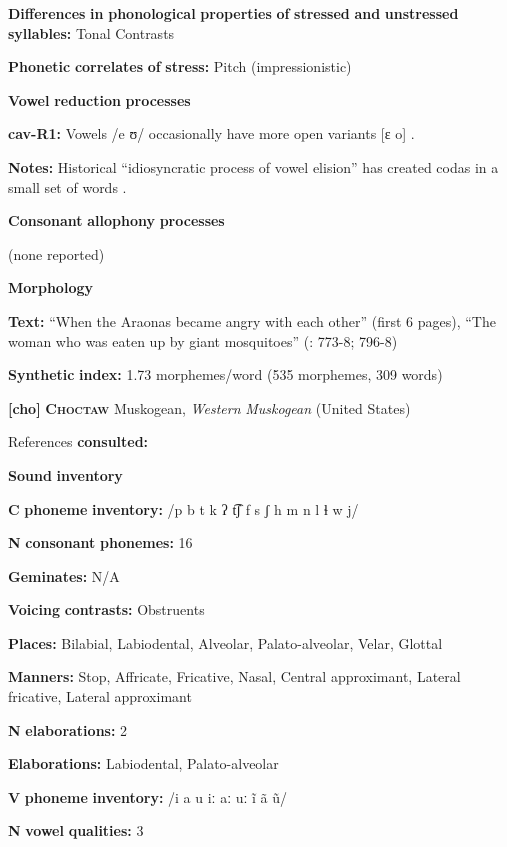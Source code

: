 \begin{styleBody}
\textbf{Differences} \textbf{in} \textbf{phonological} \textbf{properties} \textbf{of} \textbf{stressed} \textbf{and} \textbf{unstressed} \textbf{syllables:} Tonal Contrasts

\textbf{Phonetic} \textbf{correlates} \textbf{of} \textbf{stress:} Pitch (impressionistic)

\textbf{Vowel} \textbf{reduction} \textbf{processes}

\textbf{cav-R1:} Vowels /e ʊ/ occasionally have more open variants [ɛ o] \citep[29]{Guillaume2008}.

\textbf{Notes:} Historical “idiosyncratic process of vowel elision” has created codas in a small set of words \citep[29]{Guillaume2008}.

\textbf{Consonant} \textbf{allophony} \textbf{processes}

(none reported)

\textbf{Morphology}

\textbf{Text:} “When the Araonas became angry with each other” (first 6 pages), “The woman who was eaten up by giant mosquitoes” (\citealt{Guillaume2008}: 773-8; 796-8)

\textbf{Synthetic} \textbf{index:} 1.73 morphemes/word (535 morphemes, 309 words)

\textbf{[cho]}   \textbf{\textsc{Choctaw}}  Muskogean, \textit{Western} \textit{Muskogean} (United States)

References \textbf{consulted:} \citet{Broadwell2006}

\textbf{Sound} \textbf{inventory}

\textbf{C} \textbf{phoneme} \textbf{inventory:} /p b t k ʔ t͡ʃ f s ʃ h m n l ɬ w j/

\textbf{N} \textbf{consonant} \textbf{phonemes:} 16

\textbf{Geminates:} N/A

\textbf{Voicing} \textbf{contrasts:} Obstruents

\textbf{Places:} Bilabial, Labiodental, Alveolar, Palato-alveolar, Velar, Glottal

\textbf{Manners:} Stop, Affricate, Fricative, Nasal, Central approximant, Lateral fricative, Lateral approximant

\textbf{N} \textbf{elaborations:} 2

\textbf{Elaborations:} Labiodental, Palato-alveolar

\textbf{V} \textbf{phoneme} \textbf{inventory:} /i a u iː aː uː ĩ ã ũ/

\textbf{N} \textbf{vowel} \textbf{qualities:} 3


\end{styleBody}
